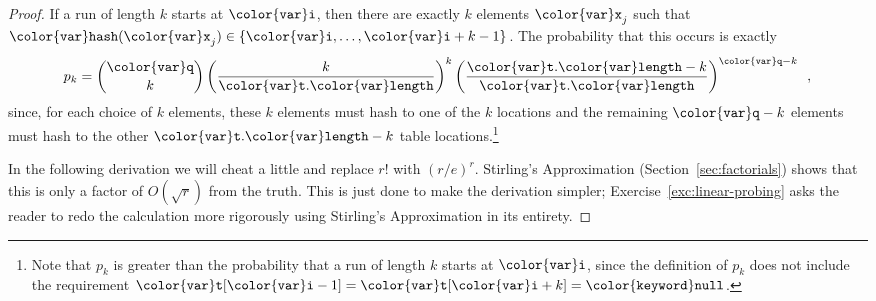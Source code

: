 \documentclass[10pt]{book}
\newcommand{\secref}[1]{Section~\ref{sec:#1}}
\theoremstyle{plain}
\theoremstyle{definition}
\newcommand{\excref}[1]{Exercise~\ref{exc:#1}}
\begin{document}
\begin{proof}
If a run of length $k$ starts at \ensuremath{\mathtt{{\color{var}i}}}, then there are exactly $k$
elements $\ensuremath{\mathtt{{\color{var}x}}}_j$ such that $\ensuremath{\mathtt{{\color{var}hash}}}(\ensuremath{\mathtt{{\color{var}x}}}_j)\in\{\ensuremath{\mathtt{{\color{var}i}}},\ldots,\ensuremath{\mathtt{{\color{var}i}}}+k-1\}$.
The probability that this occurs is exactly
\[
  p_k  = \binom{\ensuremath{\mathtt{{\color{var}q}}}}{k}\left(\frac{k}{\ensuremath{\mathtt{{\color{var}t}.{\color{var}length}}}}\right)^k\left(\frac{\ensuremath{\mathtt{{\color{var}t}.{\color{var}length}}}-k}{\ensuremath{\mathtt{{\color{var}t}.{\color{var}length}}}}\right)^{\ensuremath{\mathtt{{\color{var}q}}}-k} \enspace ,
\]
since, for each choice of $k$ elements, these $k$ elements must hash to
one of the $k$ locations and the remaining $\ensuremath{\mathtt{{\color{var}q}}}-k$ elements must hash to
the other $\ensuremath{\mathtt{{\color{var}t}.{\color{var}length}}}-k$ table locations.\footnote{Note that $p_k$ is greater
than the probability that a run of length $k$ starts at \ensuremath{\mathtt{{\color{var}i}}}, since the definition of $p_k$ does not include the requirement $\ensuremath{\mathtt{{\color{var}t}}}[\ensuremath{\mathtt{{\color{var}i}}}-1]=\ensuremath{\mathtt{{\color{var}t}}}[\ensuremath{\mathtt{{\color{var}i}}}+k]=\ensuremath{\mathtt{{\color{keyword}null}}}$.}

In the following derivation we will cheat a little and replace $r!$ with
$(r/e)^r$. Stirling's Approximation (\secref{factorials}) shows that this
is only a factor of $O(\sqrt{r})$ from the truth.  This is just done to
make the derivation simpler; \excref{linear-probing} asks the reader to
redo the calculation more rigorously using Stirling's Approximation in
its entirety.


\end{proof}
\end{document}
